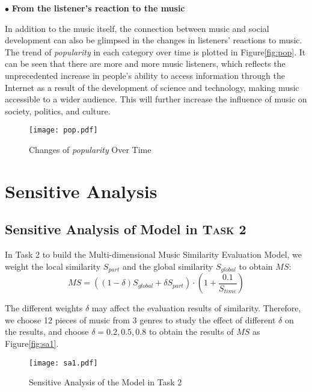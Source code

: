 \documentclass[12pt]{article}  %
\newenvironment{shrinkeq}[1]
{ \bgroup
	\addtolength\abovedisplayshortskip{#1}
	\addtolength\abovedisplayskip{#1}
	\addtolength\belowdisplayshortskip{#1}
	\addtolength\belowdisplayskip{#1}}
{\egroup\ignorespacesafterend}
\begin{document}
$\bullet$ \textbf{From the listener's reaction to the music}

In addition to the music itself, the connection between music and social development can also be glimpsed in the changes in listeners' reactions to music. The trend of \emph{popularity} in each category over time is plotted in Figure\eqref{fig:pop}. It can be seen that there are more and more music listeners, which reflects the unprecedented increase in people's ability to access information through the Internet as a result of the development of science and technology, making music accessible to a wider audience. This will further increase the influence of music on society, politics, and culture.

\vspace{-0.3cm}
\begin{figure}[htbp]
	\centering
	\texttt{[image: pop.pdf]}
	\caption{Changes of \emph{popularity} Over Time}\label{fig:pop}
\end{figure}
\vspace{-0.9cm}

\section{Sensitive Analysis}
\vspace{-0.3cm}
\subsection{Sensitive Analysis of Model in \textsc{Task} 2 }

In Task 2 to build the Multi-dimensional Music Similarity Evaluation Model, we weight the local similarity $S_{part}$ and the global similarity $S_{global}$ to obtain $MS$:
\begin{shrinkeq}{-1.5ex}
	\begin{equation}
		MS=((1-\delta) S_{global}+ \delta S_{part})\cdot(1+\frac{0.1}{S_{time}})
	\end{equation}
\end{shrinkeq}

The different weights $\delta$ may affect the evaluation results of similarity. Therefore, we choose 12 pieces of music from 3 genres to study the effect of different $\delta$ on the results, and choose $\delta = 0.2, 0.5, 0.8$ to obtain the results of $MS$ as Figure\eqref{fig:sa1}.

\begin{figure}[htbp]
	\centering
	\texttt{[image: sa1.pdf]}
	\caption{Sensitive Analysis of the Model in Task 2}\label{fig:sa1}
\end{figure}
\end{document}
